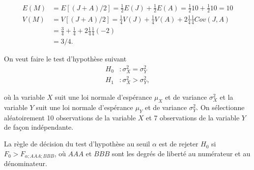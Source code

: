 \begin{questions}
\begin{solution}
        \begin{align*}
            E(M) &= E[(J+A)/2] = \frac{1}{2}E(J)+\frac{1}{2}E(A)= \frac{1}{2}10+\frac{1}{2}10=10\\
            V(M) &= V[(J+A)/2]=\frac{1}{4}V(J)+\frac{1}{4}V(A)+2\frac{1}{4}\frac{1}{4}Cov(J,A)\\
            &= \frac{3}{4}+\frac{1}{4}+2\frac{1}{4}\frac{1}{4}(-2)\\
            &= 3/4.
        \end{align*}
\end{solution}

\vspace{8cm}

\pageblanche

\question\label{test2variances}

On veut faire le test d'hypothèse suivant 
\begin{align*}
H_0 &:\sigma_X^2 = \sigma_Y^2\\
H_1 &:\sigma_X^2 > \sigma_Y^2,
\end{align*}

où la variable $X$ suit une loi normale d'espérance $\mu_X$ et de variance $\sigma_X^2$ et la variable $Y$ suit une loi normale d'espérance $\mu_Y$ et de variance $\sigma_Y^2$. On sélectionne aléatoirement 10 observations de la variable $X$ et 7 observations de la variable $Y$ de façon indépendante. 

La règle de décision du test d'hypothèse au seuil $\alpha$ est de rejeter $H_0$ si $F_0>F_{\alpha;AAA;BBB}$, où $AAA$ et $BBB$ sont les degrés de liberté au numérateur et au dénominateur.

\vspace{0.5cm}

\end{questions}
